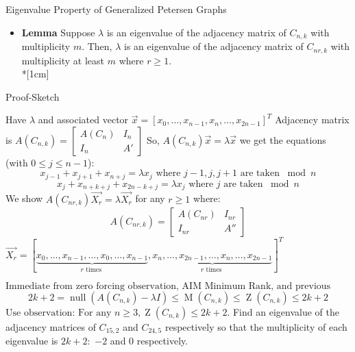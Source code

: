 \documentclass[final]{beamer}
\newcommand{\M}{\operatorname{M}}
\newcommand{\Z}{\operatorname{Z}}
\newcommand{\nul}{\operatorname{null}}
\newcommand{\bit}{\begin{itemize}}
\newcommand{\eit}{\end{itemize}}
\begin{document}
\begin{frame}{}
\begin{columns}[t]
\begin{column}{0.38\linewidth}
\begin{block}{Eigenvalue Property of Generalized Petersen Graphs} 
\bit
\item[]{\bf Lemma}
Suppose $\lambda$ is an eigenvalue of the adjacency matrix of $C_{n,k}$ with multiplicity $m$. Then, $\lambda$ is an eigenvalue of the adjacency matrix of $C_{nr,k}$ with multiplicity at least $m$ where $r \geq 1$.\\*[1cm]
\eit
\end{block}

\begin{block}{Proof-Sketch}
        
Have $\lambda$ and associated vector $\vec{x}=[x_0, \ldots, x_{n-1}, x_{n}, \ldots, x_{2n-1}]^T$
Adjacency matrix is $A(C_{n,k}) = \begin{bmatrix} A(C_{n}) & I_{n}\\
I_{n} & A' \end{bmatrix}$
So, $A(C_{n,k})\vec{x} = \lambda \vec{x}$ we get the equations (with $0 \leq j \leq n-1$):
$$x_{j-1} + x_{j+1} + x_{n+j} = \lambda x_j \text{ where }j-1,j,j+1 \text{ are taken }\bmod n$$
$$x_{j} + x_{n+k+j} + x_{2n-k+j} = \lambda x_j \text{ where }j \text{ are taken }\bmod n$$
We show $A(C_{nr,k}) \vec{X_r} = \lambda \vec{X_r}$ for any $r \geq 1$ where:
$$A(C_{nr,k}) = \begin{bmatrix} A(C_{nr}) & I_{nr}\\
I_{nr} & A'' \end{bmatrix}$$
$\vec{X_r} = [\underbrace{x_0, \ldots, x_{n-1}, \ldots, x_0, \ldots, x_{n-1}}_{r \text{ times }}, \underbrace{x_{n}, \ldots, x_{2n-1}, \ldots, x_{n}, \ldots, x_{2n-1}}_{r \text{ times }}]^T$

$$\text{Immediate from zero forcing observation, AIM Minimum Rank, and previous lemma}$$
\[
2k+2 = \nul(A(C_{n,k}) - \lambda I) \leq \M(C_{n,k}) \leq \Z(C_{n,k}) \leq 2k+2
\]
$\text{Use observation:  For any }n \geq 3, \Z(C_{n,k}) \leq 2k + 2$.
Find an eigenvalue of the adjacency matrices of $C_{15,2}$ and $C_{24,5}$ respectively so that the multiplicity of  each eigenvalue is $2k+2:$ $-2$ and $0$ respectively.
\end{block}




     

\end{column}%
    

\end{columns}
\end{frame}
\end{document}

